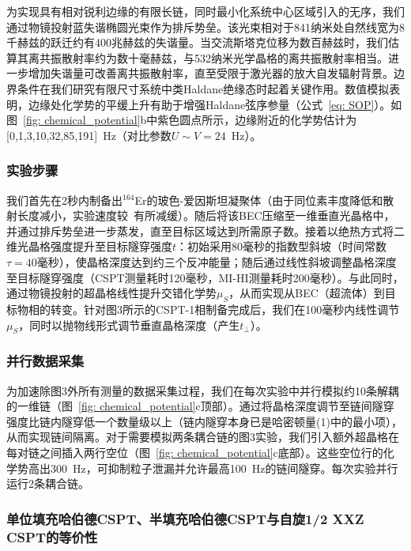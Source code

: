 \documentclass[preprint,superscriptaddress,floatfix, nofootinbib]{revtex4-2}
\begin{document}
为实现具有相对锐利边缘的有限长链，同时最小化系统中心区域引入的无序，我们通过物镜投射蓝失谐椭圆光束作为排斥势垒\cite{Gaunt2013}。该光束相对于841纳米处自然线宽为8千赫兹的跃迁约有400兆赫兹的失谐量。当交流斯塔克位移为数百赫兹时，我们估算其离共振散射率约为数十毫赫兹，与532纳米光学晶格的离共振散射率相当。进一步增加失谐量可改善离共振散射率，直至受限于激光器的放大自发辐射背景。边界条件在我们研究有限尺寸系统中类Haldane绝缘态时起着关键作用。数值模拟表明，边缘处化学势的平缓上升有助于增强Haldane弦序参量（公式~\eqref{eq: SOP}）。如图~\ref{fig: chemical_potential}b中紫色圆点所示，边缘附近的化学势估计为[0,1,3,10,32,85,191]~Hz（对比参数$U\sim V=24$~Hz）。
\subsubsection*{实验步骤}

我们首先在2秒内制备出$^{164}$Er的玻色-爱因斯坦凝聚体（由于同位素丰度降低和散射长度减小，实验速度较~\cite{Phelps2020}有所减缓）。随后将该BEC压缩至一维垂直光晶格中，并通过排斥势垒进一步蒸发，直至目标区域达到所需原子数。接着以绝热方式将二维光晶格强度提升至目标隧穿强度$t$：初始采用80毫秒的指数型斜坡（时间常数$\tau = 40$毫秒），使晶格深度达到约三个反冲能量；随后通过线性斜坡调整晶格深度至目标隧穿强度（CSPT测量耗时120毫秒，MI-HI测量耗时200毫秒）。与此同时，通过物镜投射的超晶格线性提升交错化学势$\mu_S$，从而实现从BEC（超流体）到目标物相的转变。针对图3所示的CSPT-1相制备完成后，我们在100毫秒内线性调节$\mu_S$，同时以抛物线形式调节垂直晶格深度（产生$t_\perp$）。
\subsubsection*{并行数据采集}

为加速除图3外所有测量的数据采集过程，我们在每次实验中并行模拟约10条解耦的一维链（图~\ref{fig: chemical_potential}c顶部）。通过将晶格深度调节至链间隧穿强度比链内隧穿低一个数量级以上（链内隧穿本身已是哈密顿量(1)中的最小项），从而实现链间隔离。对于需要模拟两条耦合链的图3实验，我们引入额外超晶格在每对链之间插入两行空位（图~\ref{fig: chemical_potential}c底部）。这些空位行的化学势高出300~Hz，可抑制粒子泄漏并允许最高100~Hz的链间隧穿。每次实验并行运行2条耦合链。
\subsubsection*{单位填充哈伯德CSPT、半填充哈伯德CSPT与自旋1/2 XXZ CSPT的等价性}
\end{document}
